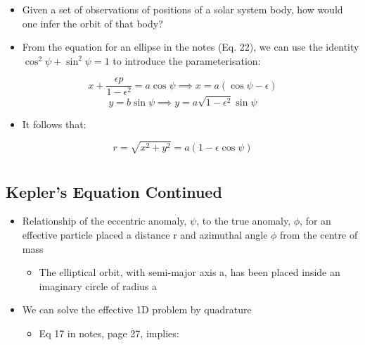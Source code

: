 \documentclass[a4paper,11pt,normalem]{article}
\begin{document}
\begin{example}

\begin{itemize}
\item
  Given a set of observations of positions of a solar system body, how
  would one infer the orbit of that body?
\item
  From the equation for an ellipse in the notes (Eq. 22), we can use the
  identity \(\cos^2\psi +\sin^2\psi = 1\) to introduce the
  parameterisation:
\end{itemize}

\[
    x + \frac{\epsilon p}{1 - \epsilon^2} = a\cos\psi \implies x = a(\cos\psi - \epsilon) \]
\[
    y = b\sin\psi \implies y = a\sqrt{1 - \epsilon^2}\sin\psi
\]

\begin{itemize}
\item
  It follows that:
\end{itemize}

\[
    r = \sqrt{x^2 + y^2} = a(1 - \epsilon\cos\psi)
\]
\end{example}

\section{}\label{lecture-10}

\subsection{Kepler's Equation Continued}\label{keplers-equation-continued}

\begin{itemize}
\item
  Relationship of the eccentric anomaly, \(\psi\), to the true anomaly,
  \(\phi\), for an effective particle placed a distance r and azimuthal
  angle \(\phi\) from the centre of mass
  \begin{itemize}
  \item
    The elliptical orbit, with semi-major axis a, has been placed inside
    an imaginary circle of radius a
  \end{itemize}
\item
  We can solve the effective 1D problem by quadrature
  \begin{itemize}
  \item
    Eq 17 in notes, page 27, implies:
  \end{itemize}
\end{itemize}
\end{document}
